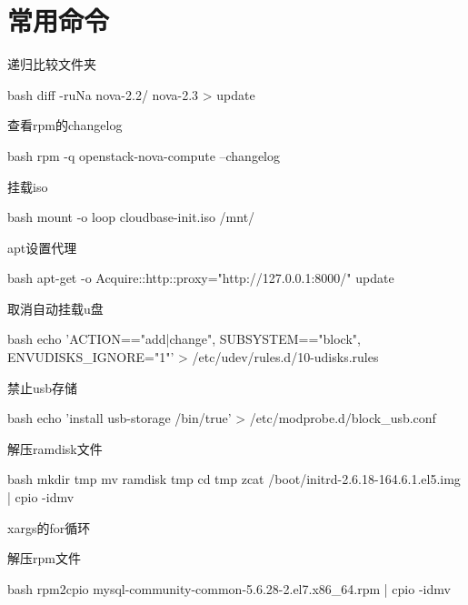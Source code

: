 \section{常用命令}
\begin{outline}[enumerate]
\1 递归比较文件夹
\begin{code-in-enumerate}{bash}
diff -ruNa nova-2.2/ nova-2.3 > update
\end{code-in-enumerate}

\1 查看rpm的changelog
\begin{code-in-enumerate}{bash}
rpm -q openstack-nova-compute --changelog
\end{code-in-enumerate}

\1 挂载iso
\begin{code-in-enumerate}{bash}
mount -o loop cloudbase-init.iso /mnt/
\end{code-in-enumerate}

\1 apt设置代理
\begin{code-in-enumerate}{bash}
apt-get -o Acquire::http::proxy="http://127.0.0.1:8000/" update
\end{code-in-enumerate}

\1 取消自动挂载u盘
\begin{code-in-enumerate}{bash}
echo 'ACTION=="add|change", SUBSYSTEM=="block", ENV{UDISKS_IGNORE}="1"' > /etc/udev/rules.d/10-udisks.rules
\end{code-in-enumerate}

\1 禁止usb存储
\begin{code-in-enumerate}{bash}
echo 'install usb-storage /bin/true' > /etc/modprobe.d/block_usb.conf
\end{code-in-enumerate}

\1 解压ramdisk文件
\begin{code-in-enumerate}{bash}
mkdir tmp
mv ramdisk tmp
cd tmp
zcat /boot/initrd-2.6.18-164.6.1.el5.img | cpio -idmv
\end{code-in-enumerate}

\1 xargs的for循环

\1 解压rpm文件
\begin{code-in-enumerate}{bash}
rpm2cpio mysql-community-common-5.6.28-2.el7.x86_64.rpm | cpio -idmv
\end{code-in-enumerate}


\end{outline}
